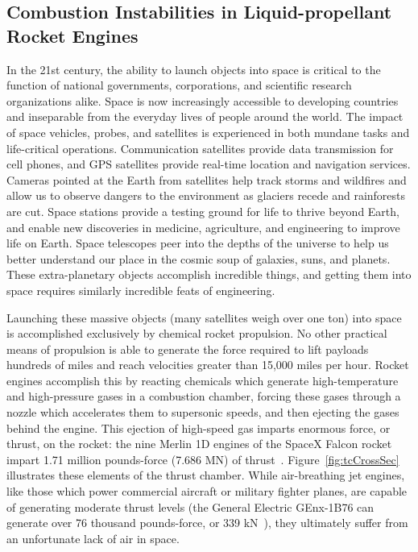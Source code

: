 \subsection{Combustion Instabilities in Liquid-propellant Rocket Engines}

In the 21st century, the ability to launch objects into space is critical to the function of national governments, corporations, and scientific research organizations alike. Space is now increasingly accessible to developing countries and inseparable from the everyday lives of people around the world. The impact of space vehicles, probes, and satellites is experienced in both mundane tasks and life-critical operations. Communication satellites provide data transmission for cell phones, and GPS satellites provide real-time location and navigation services. Cameras pointed at the Earth from satellites help track storms and wildfires and allow us to observe dangers to the environment as glaciers recede and rainforests are cut. Space stations provide a testing ground for life to thrive beyond Earth, and enable new discoveries in medicine, agriculture, and engineering to improve life on Earth. Space telescopes peer into the depths of the universe to help us better understand our place in the cosmic soup of galaxies, suns, and planets. These extra-planetary objects accomplish incredible things, and getting them into space requires similarly incredible feats of engineering.

Launching these massive objects (many satellites weigh over one ton) into space is accomplished exclusively by chemical rocket propulsion. No other practical means of propulsion is able to generate the force required to lift payloads hundreds of miles and reach velocities greater than 15,000 miles per hour. Rocket engines accomplish this by reacting chemicals which generate high-temperature and high-pressure gases in a combustion chamber, forcing these gases through a nozzle which accelerates them to supersonic speeds, and then ejecting the gases behind the engine. This ejection of high-speed gas imparts enormous force, or thrust, on the rocket: the nine Merlin 1D engines of the SpaceX Falcon rocket impart 1.71 million pounds-force (7.686 MN) of thrust~\cite{falconGuide}. Figure~\ref{fig:tcCrossSec} illustrates these elements of the thrust chamber. While air-breathing jet engines, like those which power commercial aircraft or military fighter planes, are capable of generating moderate thrust levels (the General Electric GEnx-1B76 can generate over 76 thousand pounds-force, or 339 kN~\cite{genxSpecs}), they ultimately suffer from an unfortunate lack of air in space.

